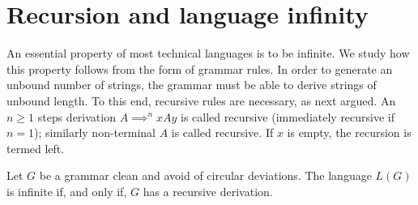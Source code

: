 \section{Recursion and language infinity}

An essential property of most technical languages is to be infinite. We study how this property follows from the form of grammar rules. In order to generate an 
unbound number of strings, the grammar must be able to derive strings of unbound length. To this end, recursive rules are necessary, as next argued. An $n \geq 1$ 
steps derivation $A \implies^{n}xAy$ is called recursive (immediately recursive if $n=1$); similarly non-terminal $A$ is called recursive. If $x$ is empty, the recursion 
is termed left.

Let $G$ be a grammar clean and avoid of circular deviations. The language $L ( G )$ is infinite if, and only if, $G$ has a recursive derivation.